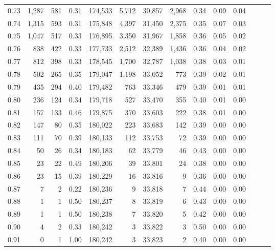 \begin{tabular}{rrrrrrrrrrrrrr}
0.73 &  1,287 &  581 &  0.31 &  174,533 &    5,712 &  30,857 &   2,968 &  0.34 &  0.09 &      0.04 \\
0.74 &  1,315 &  593 &  0.31 &  175,848 &    4,397 &  31,450 &   2,375 &  0.35 &  0.07 &      0.03 \\
0.75 &  1,047 &  517 &  0.33 &  176,895 &    3,350 &  31,967 &   1,858 &  0.36 &  0.05 &      0.02 \\
0.76 &    838 &  422 &  0.33 &  177,733 &    2,512 &  32,389 &   1,436 &  0.36 &  0.04 &      0.02 \\
0.77 &    812 &  398 &  0.33 &  178,545 &    1,700 &  32,787 &   1,038 &  0.38 &  0.03 &      0.01 \\
0.78 &    502 &  265 &  0.35 &  179,047 &    1,198 &  33,052 &     773 &  0.39 &  0.02 &      0.01 \\
0.79 &    435 &  294 &  0.40 &  179,482 &      763 &  33,346 &     479 &  0.39 &  0.01 &      0.01 \\
0.80 &    236 &  124 &  0.34 &  179,718 &      527 &  33,470 &     355 &  0.40 &  0.01 &      0.00 \\
0.81 &    157 &  133 &  0.46 &  179,875 &      370 &  33,603 &     222 &  0.38 &  0.01 &      0.00 \\
0.82 &    147 &   80 &  0.35 &  180,022 &      223 &  33,683 &     142 &  0.39 &  0.00 &      0.00 \\
0.83 &    111 &   70 &  0.39 &  180,133 &      112 &  33,753 &      72 &  0.39 &  0.00 &      0.00 \\
0.84 &     50 &   26 &  0.34 &  180,183 &       62 &  33,779 &      46 &  0.43 &  0.00 &      0.00 \\
0.85 &     23 &   22 &  0.49 &  180,206 &       39 &  33,801 &      24 &  0.38 &  0.00 &      0.00 \\
0.86 &     23 &   15 &  0.39 &  180,229 &       16 &  33,816 &       9 &  0.36 &  0.00 &      0.00 \\
0.87 &      7 &    2 &  0.22 &  180,236 &        9 &  33,818 &       7 &  0.44 &  0.00 &      0.00 \\
0.88 &      1 &    1 &  0.50 &  180,237 &        8 &  33,819 &       6 &  0.43 &  0.00 &      0.00 \\
0.89 &      1 &    1 &  0.50 &  180,238 &        7 &  33,820 &       5 &  0.42 &  0.00 &      0.00 \\
0.90 &      4 &    2 &  0.33 &  180,242 &        3 &  33,822 &       3 &  0.50 &  0.00 &      0.00 \\
0.91 &      0 &    1 &  1.00 &  180,242 &        3 &  33,823 &       2 &  0.40 &  0.00 &      0.00 \\

\end{tabular}
